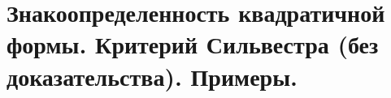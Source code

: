 \section{
    Знакоопределенность квадратичной формы. Критерий Сильвестра (без доказательства). Примеры.
}



